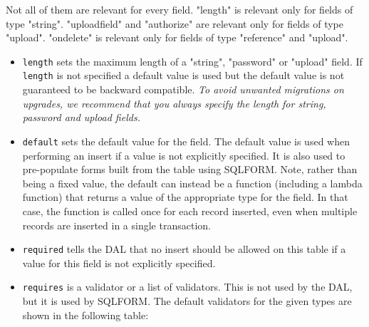 \documentclass[justified,sixbynine,notoc]{tufte-book}
\def\ft{\small\tt}
\begin{document}
\begin{fullwidth}
Not all of them are relevant for every field. "length" is relevant only for fields of type "string". "uploadfield" and "authorize" are relevant only for fields of type "upload". "ondelete" is relevant only for fields of type "reference" and "upload".
\begin{itemize}
\item {\ft length} sets the maximum length of a "string", "password" or "upload" field.  If {\ft length} is not specified a default value is used but the default value is not guaranteed to be backward compatible. {\it To avoid unwanted migrations on upgrades, we recommend that you always specify the length for string, password and upload fields.}

\item {\ft default} sets the default value for the field. The default value is used when performing an insert if a value is not explicitly specified. It is also used to pre-populate forms built from the table using SQLFORM. Note, rather than being a fixed value, the default can instead be a function (including a lambda function) that returns a value of the appropriate type for the field. In that case, the function is called once for each record inserted, even when multiple records are inserted in a single transaction.

\item {\ft required} tells the DAL that no insert should be allowed on this table if a value for this field is not explicitly specified.

\item {\ft requires} is a validator or a list of validators. This is not used by the DAL, but it is used by SQLFORM. The default validators for the given types are shown in the following table:
\end{itemize}


\end{fullwidth}
\end{document}
